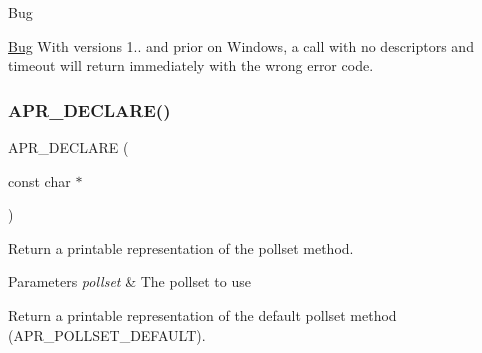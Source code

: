 \begin{DoxyRefDesc}{Bug}
\item[\mbox{\hyperlink{bug__bug000005}{Bug}}]With versions 1.. and prior on Windows, a call with no descriptors and timeout will return immediately with the wrong error code. \end{DoxyRefDesc}
\mbox{\label{group__apr__poll_gaef92b86069b7cf1da2ef15b186ec1552}} 
\subsubsection{\texorpdfstring{A\+P\+R\+\_\+\+D\+E\+C\+L\+A\+R\+E()}{APR\_DECLARE()}\hspace{0.1cm}{\footnotesize\ttfamily [2/2]}}
{\footnotesize\ttfamily A\+P\+R\+\_\+\+D\+E\+C\+L\+A\+RE (\begin{DoxyParamCaption}\item[{const char $\ast$}]{ }\end{DoxyParamCaption})}

Return a printable representation of the pollset method. 
\begin{DoxyParams}{Parameters}
{\em pollset} & The pollset to use\\
\hline
\end{DoxyParams}
Return a printable representation of the default pollset method (A\+P\+R\+\_\+\+P\+O\+L\+L\+S\+E\+T\+\_\+\+D\+E\+F\+A\+U\+LT). 
